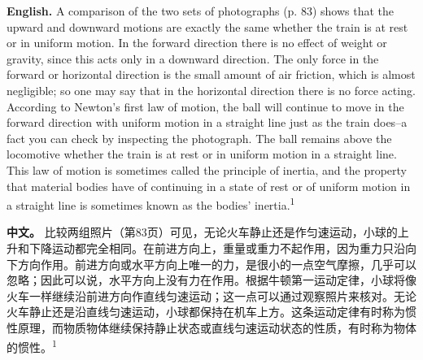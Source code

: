 \noindent\textbf{English.} A comparison of the two sets of photographs (p. 83) shows that the upward and downward motions are exactly the same whether the train is at rest or in uniform motion. In the forward direction there is no effect of weight or gravity, since this acts only in a downward direction. The only force in the forward or horizontal direction is the small amount of air friction, which is almost negligible; so one may say that in the horizontal direction there is no force acting. According to Newton's first law of motion, the ball will continue to move in the forward direction with uniform motion in a straight line just as the train does--a fact you can check by inspecting the photograph. The ball remains above the locomotive whether the train is at rest or in uniform motion in a straight line. This law of motion is sometimes called the principle of inertia, and the property that material bodies have of continuing in a state of rest or of uniform motion in a straight line is sometimes known as the bodies' inertia.\textsuperscript{1}
\par\noindent\textbf{中文。} 比较两组照片（第83页）可见，无论火车静止还是作匀速运动，小球的上升和下降运动都完全相同。在前进方向上，重量或重力不起作用，因为重力只沿向下方向作用。前进方向或水平方向上唯一的力，是很小的一点空气摩擦，几乎可以忽略；因此可以说，水平方向上没有力在作用。根据牛顿第一运动定律，小球将像火车一样继续沿前进方向作直线匀速运动；这一点可以通过观察照片来核对。无论火车静止还是沿直线匀速运动，小球都保持在机车上方。这条运动定律有时称为惯性原理，而物质物体继续保持静止状态或直线匀速运动状态的性质，有时称为物体的惯性。\textsuperscript{1}
\medskip

